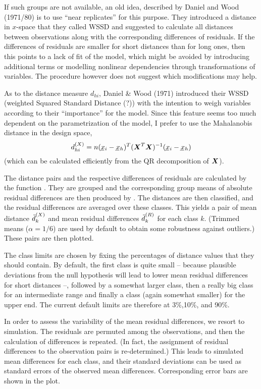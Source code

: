 \documentclass[11pt]{article}\usepackage[]{graphicx}\usepackage[]{color}
\begin{document}
If such groups are not available, an old idea, described by
Daniel and Wood (1971/80) is to use ``near replicates'' for this purpose. 
They introduced a distance in $x$-space that they called WSSD and suggested
to calculate all distances between observations along with the
corresponding differences of residuals. If the differences of residuals
are smaller for short distances than for long ones, then this points to a
lack of fit of the model, which might be avoided by introducing 
additional terms or modelling nonlinear dependencies through
transformations of variables. The procedure however does not suggest
which modifications may help.

As to the distance measure $d_{hi}$, %
Daniel \& Wood (1971) introduced their 
WSSD (weighted Squared Standard Distance (?))
with the intention to weigh variables according to their ``importance'' for
the model. Since this feature seems too much dependent on the
parametrization of the model, I prefer to use the Mahalanobis distance in
the design space, 
$$
  d\sups X_{hi} = n(\vc x_i-\vc x_h)^T (\mx X^T\mx X)^{-1} (\vc x_i-\vc x_h)
$$
(which can be calculated efficiently from the QR decomposition of $\mx X$).

The distance pairs and the respective differences of residuals are
calculated by the function \Hneed{40mm}
. They are grouped and the
corresponding group means of absolute residual differences are then
produced by . 
The distances are then classified, and the residual differences
are averaged over these classes. This yields a pair of mean distance 
$\wb d\sups X_k$ and mean residual differences $\wb d\sups R_k$ 
for each class $k$. 
(Trimmed means ($\alpha=1/6$) are used by default to obtain some
robustness against outliers.)
These pairs are then plotted.

The class limits are chosen by fixing the percentages of distance values
that they should contain. By default, the first class is quite small -- 
because plausible deviations from the null hypothesis will lead to lower
mean residual differences for short distances --, followed by a somewhat
larger class, then a really big class for an intermediate range and finally
a class (again somewhat smaller) for the upper end. 
The current default limits are therefore at 3\%,10\%, and 90\%. 

In order to assess the variability of the mean residual differences,
we resort to simulation. The residuals are permuted among the observations,
and then the calculation of differences is repeated.
(In fact, the assignment of residual differences to the observation pairs 
is re-determined.) This leads to simulated mean differences for each class,
and their standard deviations can be used as standard errors of the 
observed mean differences. Corresponding error bars are shown in the
plot. 
\end{document}
